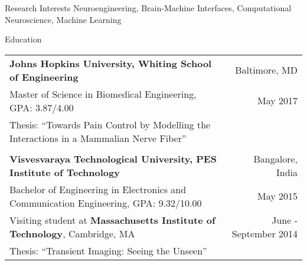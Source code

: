 \documentclass{resume}
\begin{document}
\thispagestyle{empty}
  \begin{rSection}{Research Interests}
Neuroengineering, Brain-Machine Interfaces, Computational Neuroscience, Machine Learning
  \end{rSection}
  \begin{rSection}{Education}
\begin{tabular*}{\textwidth}{@{\extracolsep{\fill}}lr@{}}
\textbf{Johns Hopkins University, Whiting School of Engineering} & Baltimore, MD \\
{Master of Science in Biomedical Engineering}, GPA: 3.87/4.00 & May 2017 \\
Thesis: {``Towards Pain Control by Modelling the Interactions in a Mammalian Nerve Fiber''}\\ \\
\textbf{Visvesvaraya Technological University, PES Institute of Technology} & Bangalore, India \\
{Bachelor of Engineering in Electronics and Communication Engineering}, GPA: 9.32/10.00 & May 2015 \\
Visiting student at \textbf{Massachusetts Institute of Technology}, Cambridge, MA & June - September 2014 \\
Thesis: {``Transient Imaging: Seeing the Unseen''}\\
\end{tabular*}
  \end{rSection}

\vspace{1em}
\end{document}
